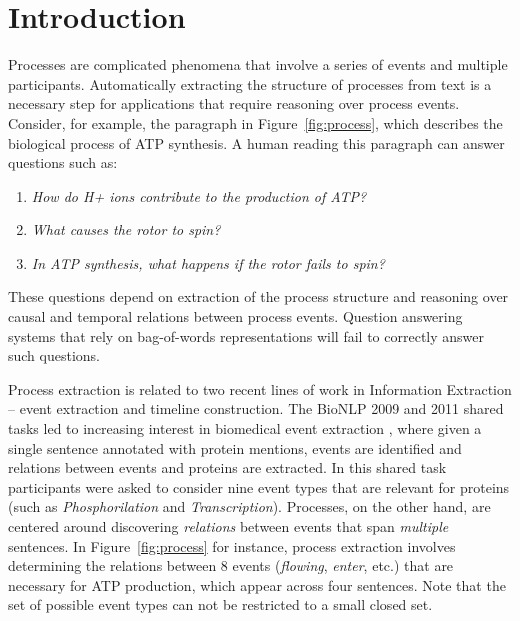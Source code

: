 \section{Introduction}

Processes are complicated phenomena that involve a series of events and multiple participants. Automatically extracting the structure of processes from text is a necessary step for applications that require reasoning over process events. Consider, for example, the paragraph in Figure~\ref{fig:process}, which describes the biological process of ATP synthesis. A human reading this paragraph can answer questions such as:

\begin{enumerate}[itemsep=0pt,topsep=0pt] 
\item \footnotesize \emph{How do H+ ions contribute to the production of ATP?}
\item \footnotesize\emph{What causes the rotor to spin?}
\item \footnotesize \emph{In ATP synthesis, what happens if the rotor fails to spin?}
\end{enumerate}

\noindent These questions depend on extraction of the process structure and reasoning over causal and temporal relations between process events. Question answering systems that rely on bag-of-words representations will fail to correctly answer such questions.


Process extraction is related to two recent lines of work in Information Extraction -- event extraction and timeline construction. The BioNLP 2009 and 2011 shared tasks \cite{kim09,kim11} led to increasing interest in biomedical event extraction \cite{Poon10,Miwa10,riedel11fast,Mcclosky11,Bjorne11}, where given a single sentence annotated with protein mentions, events are identified and relations between events and proteins are extracted. In this shared task participants were asked to consider nine event types that are relevant for proteins (such as \emph{Phosphorilation} and \emph{Transcription}). Processes, on the other hand,  are centered around discovering \emph{relations} between events that span \emph{multiple} sentences. In Figure~\ref{fig:process} for instance, process extraction involves determining the relations between 8 events (\emph{flowing}, \emph{enter}, etc.) that are necessary for ATP production, which appear across four sentences. Note that the set of possible event types can not be restricted to a small closed set.


